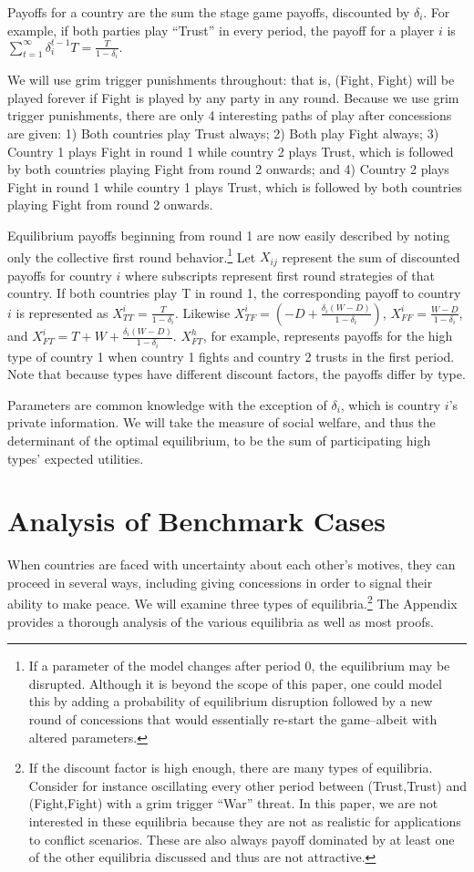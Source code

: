 \documentclass[12pt, letterpaper]{article}
\newcommand{\de}{\delta}
\begin{document}
Payoffs for a country are the sum the stage game payoffs, discounted by $\delta_i$. For example, if both parties play ``Trust'' in every period, the payoff for a player $i$ is $\sum_{t=1}^\infty \de_i^{t-1} T = \frac{T}{1-\de_i}.$

We will use grim trigger punishments throughout: that is, (Fight, Fight) will be played forever if Fight is played by any party in any round. Because we use grim trigger punishments, there are only 4 interesting paths of play after concessions are given:
1) Both countries play Trust always; 
2) Both play Fight always; 
3) Country 1 plays Fight in round 1 while country 2 plays Trust, which is followed by both countries playing Fight from round 2 onwards; and 
4) Country 2 plays Fight in round 1 while country 1 plays Trust, which is followed by both countries playing Fight from round 2 onwards.

Equilibrium payoffs beginning from round 1 are now easily described by noting only the collective first round behavior.\footnote{If a parameter of the model changes after period 0, the equilibrium may be disrupted. Although it is beyond the scope of this paper, one could model this by adding a probability of equilibrium disruption followed by a new round of concessions that would essentially re-start the game--albeit with altered parameters.} Let $X_{ij}$ represent the sum of discounted payoffs for country $i$ where subscripts represent first round strategies of that country. If both countries play T in round 1, the corresponding payoff to country $i$ is represented as $ X_{TT}^i=\frac {T}{1- \delta_i}$. Likewise $X_{TF}^i=({-D}+\frac{\delta_i(W-D)}{1- \delta_i} )$, $ X_{FF}^i=\frac{W-D}{1- \delta_i}$, and  $X_{FT}^i=T+W +\frac{\delta_i(W-D)}{1- \delta_i}$. $X_{FT}^h$, for example, represents payoffs for the high type of country 1 when country 1 fights and country 2 trusts in the first period. Note that because types have different discount factors, the payoffs differ by type.

Parameters are common knowledge with the exception of $\delta_i$, which is country $i$'s private information. We will take the measure of social welfare, and thus the determinant of the optimal equilibrium, to be the sum of participating high types' expected utilities.

\section{Analysis of Benchmark Cases}
\label{sec:bench}
When countries are faced with uncertainty about each other's motives, they can proceed in several ways, including giving concessions in order to signal their ability to make peace. We will examine three types of equilibria.\footnote{If the discount factor is high enough, there are many types of equilibria. Consider for instance oscillating every other period between (Trust,Trust) and (Fight,Fight) with a grim trigger ``War'' threat. In this paper, we are not interested in these equilibria because they are not as realistic for applications to conflict scenarios. These are also always payoff dominated by at least one of the other equilibria discussed and thus 	are not attractive.} The Appendix provides a thorough analysis of the various equilibria as well as most proofs. 
\end{document}
